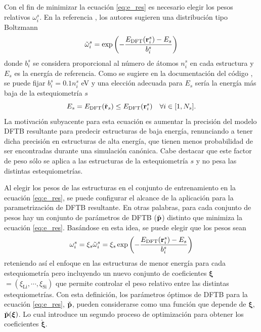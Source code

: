Con el fin de minimizar la ecuación \ref{eq:e_res} es necesario elegir los pesos 
relativos $\omega_i^s$. En la referencia \cite{van2019}, los autores sugieren una 
distribución tipo Boltzmann
\begin{equation}\label{eq:omega}
    \tilde\omega^s_i=\exp\left(-\frac{E_\text{DFT}({\bf r}^s_i)-E_s}{b^s_i}\right)
\end{equation}
donde $b^s_i$ se considera proporcional al número de átomos $n^s_i$ en cada 
estructura y $E_s$ es la energía de referencia. Como se sugiere en la
documentación del código  \cite{tango}, se puede fijar 
$b^s_i = 0.1 n^s_i$ eV y una elección adecuada para $E_s$ sería la energía más 
baja de la estequiometría $s$
\begin{equation}\label{eq:e_s}
  E_s=E_\text{DFT}(\check{{\bf r}}_s) \leq E_\text{DFT}({\bf r}^s_i) \quad \forall i \in [1,N_s].
\end{equation}
La motivación subyacente para esta ecuación es aumentar la precisión del modelo 
DFTB resultante para predecir estructuras de baja energía, renunciando a tener 
dicha precisión en estructuras de alta energía, que tienen menos probabilidad 
de ser encontradas durante una simulación canónica. Cabe destacar que este factor
de peso sólo se aplica a las estructuras de la estequiometría $s$ y no pesa las 
distintas estequiometrías.

Al elegir los pesos de las estructuras en el conjunto de entrenamiento en la 
ecuación \ref{eq:e_res}, se puede configurar el alcance de la aplicación para 
la parametrización de DFTB resultante. En otras palabras, para cada conjunto de 
pesos hay un conjunto de parámetros de DFTB ($\check{{\bf p}}$) distinto que 
minimiza la ecuación \ref{eq:e_res}. Basándose en esta idea, se puede elegir que 
los pesos sean
\begin{equation}\label{eq:omega2}
      \omega^s_i=\xi_s\tilde\omega^s_i=\xi_s\exp\left(-\frac{E_\text{DFT}({\bf r}^s_i)-E_s}{b^s_i}\right)
\end{equation} 
reteniendo así el enfoque en las estructuras de menor energía para cada 
estequiometría pero incluyendo un nuevo conjunto de coeficientes 
$\boldsymbol{\xi}$ $=\left(\xi_{\text{Li}},\cdots,\xi_{\text{Si}}\right)$ que 
permite controlar el peso relativo entre las distintas estequiometrías. Con esta 
definición, los parámetros óptimos de DFTB para la ecuación \ref{eq:e_res},
$\check{{\bf p}}$, pueden considerarse como una función que depende de 
$\boldsymbol{\xi}$, $\check{{\bf p}}(\boldsymbol{\xi})$. Lo cual 
introduce un segundo proceso de optimización para obtener los coeficientes 
$\check{\boldsymbol{\xi}}$.

